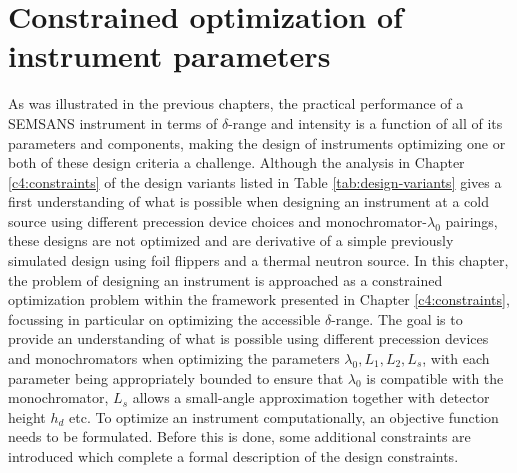 \documentclass{article}
\begin{document}
\newpage
\section{Constrained optimization of instrument parameters}
\label{c5:optimization}
As was illustrated in the previous chapters, the practical performance of a SEMSANS instrument in terms of $\delta$-range and intensity is a function of all of its parameters and components, making the design of instruments optimizing one or both of these design criteria a challenge. Although the analysis in Chapter \ref{c4:constraints} of the design variants listed in Table \ref{tab:design-variants} gives a first understanding of what is possible when designing an instrument at a cold source using different precession device choices and monochromator-$\lambda_0$ pairings, these designs are not optimized and are derivative of a simple previously simulated design \cite{bouwman2021b} using foil flippers and a thermal neutron source. In this chapter, the problem of designing an instrument is approached as a constrained optimization problem within the framework presented in Chapter \ref{c4:constraints}, focussing in particular on optimizing the accessible $\delta$-range. The goal is to provide an understanding of what is possible using different precession devices and monochromators when optimizing the parameters $\lambda_0, L_1, L_2, L_s$, with each parameter being appropriately bounded to ensure that $\lambda_0$ is compatible with the monochromator, $L_s$ allows a small-angle approximation together with detector height $h_d$ etc. 
To optimize an instrument computationally, an objective function needs to be formulated. Before this is done, some additional constraints are introduced which complete a formal description of the design constraints.
\end{document}
